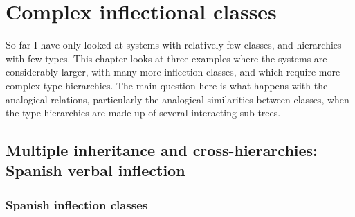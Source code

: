\chapter{Complex inflectional classes}\label{chap:complex}


So far I have only looked at systems with relatively few classes, and hierarchies with few types. This chapter looks at three examples where the systems are considerably larger, with many more inflection classes, and which require more complex type hierarchies. The main question here is what happens with the analogical relations, particularly the analogical similarities between classes, when the type hierarchies are made up of several interacting sub-trees.


\section{Multiple inheritance and cross-hierarchies: Spanish verbal inflection}

\subsection{Spanish inflection classes}


